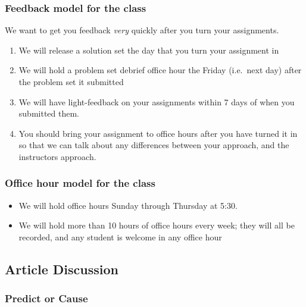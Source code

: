 \documentclass[
]{article}
\providecommand{\tightlist}{%
  \setlength{\itemsep}{0pt}\setlength{\parskip}{0pt}}
\theoremstyle{definition}
\theoremstyle{definition}
\theoremstyle{definition}
\theoremstyle{definition}
\theoremstyle{remark}
\begin{document}
\subsubsection{Feedback model for the class}\label{feedback-model-for-the-class-1}

We want to get you feedback \emph{very} quickly after you turn your assignments.

\begin{enumerate}
\def\labelenumi{\arabic{enumi}.}
\tightlist
\item
  We will release a solution set the day that you turn your assignment in
\item
  We will hold a problem set debrief office hour the Friday (i.e.~next day) after the problem set it submitted
\item
  We will have light-feedback on your assignments within 7 days of when you submitted them.
\item
  You should bring your assignment to office hours after you have turned it in so that we can talk about any differences between your approach, and the instructors approach.
\end{enumerate}

\subsubsection{Office hour model for the class}\label{office-hour-model-for-the-class-1}

\begin{itemize}
\tightlist
\item
  We will hold office hours Sunday through Thursday at 5:30.
\item
  We will hold more than 10 hours of office hours every week; they will all be recorded, and any student is welcome in any office hour
\end{itemize}

\subsection{Article Discussion}\label{article-discussion}

\subsubsection{Predict or Cause}\label{predict-or-cause}
\end{document}
